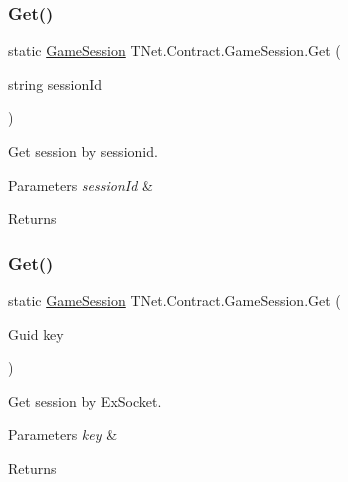 \subsubsection{\texorpdfstring{Get()}{Get()}\hspace{0.1cm}{\footnotesize\ttfamily [2/3]}}
{\footnotesize\ttfamily static \mbox{\hyperlink{class_t_net_1_1_contract_1_1_game_session}{Game\+Session}} T\+Net.\+Contract.\+Game\+Session.\+Get (\begin{DoxyParamCaption}\item[{string}]{session\+Id }\end{DoxyParamCaption})\hspace{0.3cm}{\ttfamily [static]}}



Get session by sessionid. 


\begin{DoxyParams}{Parameters}
{\em session\+Id} & \\
\hline
\end{DoxyParams}
\begin{DoxyReturn}{Returns}

\end{DoxyReturn}
\mbox{\label{class_t_net_1_1_contract_1_1_game_session_afd9b824a348ce50e5c8dbdeffdb32cba}} 
\subsubsection{\texorpdfstring{Get()}{Get()}\hspace{0.1cm}{\footnotesize\ttfamily [3/3]}}
{\footnotesize\ttfamily static \mbox{\hyperlink{class_t_net_1_1_contract_1_1_game_session}{Game\+Session}} T\+Net.\+Contract.\+Game\+Session.\+Get (\begin{DoxyParamCaption}\item[{Guid}]{key }\end{DoxyParamCaption})\hspace{0.3cm}{\ttfamily [static]}}



Get session by Ex\+Socket. 


\begin{DoxyParams}{Parameters}
{\em key} & \\
\hline
\end{DoxyParams}
\begin{DoxyReturn}{Returns}

\end{DoxyReturn}
\mbox{\label{class_t_net_1_1_contract_1_1_game_session_a2b1701baee2a3c8d412568e6173a56fd}} 
